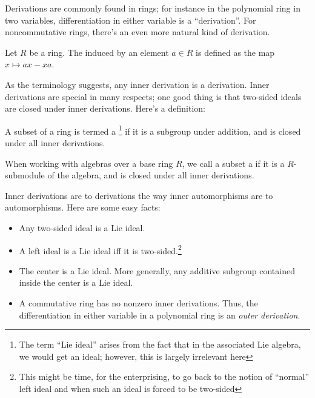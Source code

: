 \documentclass[a4paper]{amsart}
\begin{document}
Derivations are commonly found in rings; for instance in the
polynomial ring in two variables, differentiation in either variable
is a ``derivation''. For noncommutative rings, there's an even more
natural kind of derivation.

\begin{definer}
  Let $R$ be a ring. The  induced by an
  element $a \in R$ is defined as the map $x \mapsto ax - xa$.
\end{definer}

As the terminology suggests, any inner derivation is a
derivation. Inner derivations are special in many respects; one good
thing is that two-sided ideals are closed under inner
derivations. Here's a definition:

\begin{definer}
  A subset of a ring is termed a \footnote{The
    term ``Lie ideal'' arises from the fact that in the associated Lie
    algebra, we would get an ideal; however, this is largely
    irrelevant here} if it is a subgroup under addition, and is
  closed under all inner derivations.

  When working with algebras over a base ring $R$, we call a subset a
   if it is a $R$-submodule of the algebra, and
  is closed under all inner derivations.
\end{definer}

Inner derivations are to derivations the way inner automorphisms are
to automorphisms. Here are some easy facts:

\begin{itemize}

\item Any two-sided ideal is a Lie ideal.

\item A left ideal is a Lie ideal iff it is two-sided.\footnote{This
    might be time, for the enterprising, to go back to the notion of
    ``normal'' left ideal and when such an ideal is forced to be two-sided}

\item The center is a Lie ideal. More generally, any additive subgroup
  contained inside the center is a Lie ideal.

\item A commutative ring has no nonzero inner derivations. Thus, the
  differentiation in either variable in a polynomial ring is an {\em
    outer derivation}.
\end{itemize}
\end{document}
